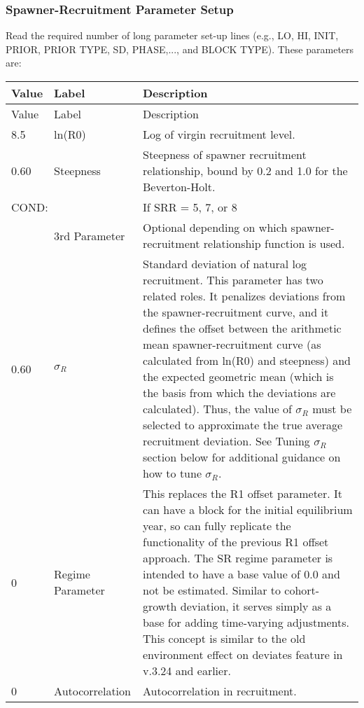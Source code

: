 \subsubsection{Spawner-Recruitment Parameter Setup}
Read the required number of long parameter set-up lines (e.g., LO, HI, INIT, PRIOR, PRIOR TYPE, SD, PHASE,..., and BLOCK TYPE). These parameters are:
\begin{longtable}{p{1cm} p{3cm} p{11cm}}
	\hline
	Value & Label & Description \Tstrut\Bstrut\\
	\hline
	\endfirsthead

	\hline
	Value & Label & Description \Tstrut\Bstrut\\
	\hline
	\endhead
	\hline
	\endfoot
	\endlastfoot

	8.5 & ln(R0) & Log of virgin recruitment level. \Tstrut\Bstrut\\
	\hline

	0.60 \Tstrut & Steepness & Steepness of spawner recruitment relationship, bound by 0.2 and 1.0 for the Beverton-Holt. \Bstrut\\

	\multicolumn{2}{l}{COND:} \Tstrut & If SRR = 5, 7, or 8 \\
	& 3rd Parameter & Optional depending on which spawner-recruitment relationship function is used. \Bstrut\\
	\hline

	0.60 \Tstrut & $\sigma_R$ & Standard deviation of natural log recruitment. This parameter has two related roles. It penalizes deviations from the spawner-recruitment curve, and it defines the offset between the arithmetic mean spawner-recruitment curve (as calculated from ln(R0) and steepness) and the expected geometric mean (which is the basis from which the deviations are calculated). Thus, the value of $\sigma_R$ must be selected to approximate the true average recruitment deviation. See \hypertarget{TuneSigmaR}{Tuning $\sigma_R$} section below for additional guidance on how to tune $\sigma_R$. \Bstrut\\

	0\Tstrut & Regime Parameter & This replaces the R1 offset parameter. It can have a block for the initial equilibrium year, so can fully replicate the functionality of the previous R1 offset approach. The SR regime parameter is intended to have a base value of 0.0 and not be estimated. Similar to cohort-growth deviation, it serves simply as a base for adding time-varying adjustments. This concept is similar to the old environment effect on deviates feature in v.3.24 and earlier. \Bstrut\\
	\hline

	0 & Autocorrelation & Autocorrelation in recruitment. \Tstrut\Bstrut\\
	\hline
\end{longtable}



